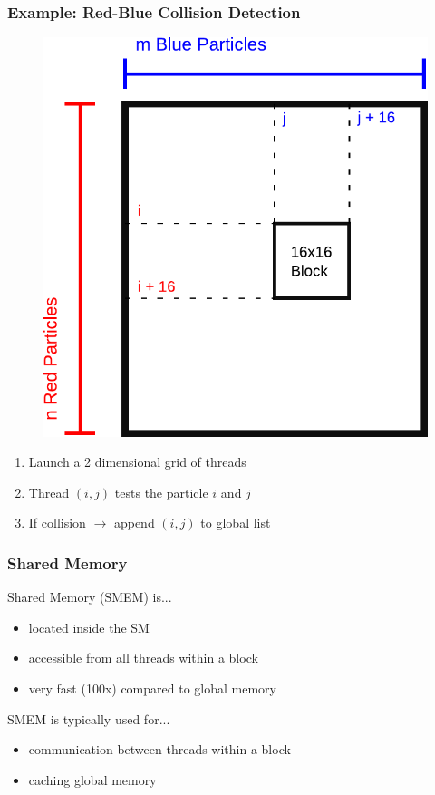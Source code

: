 \documentclass[aspectratio=169,handout]{beamer}
\begin{document}
\begin{frame}[fragile]
\frametitle{Example: Red-Blue Collision Detection}
\begin{minipage}{0.4\linewidth}
	\vspace{0.3cm}
		\begin{figure}
	\includegraphics[height=0.7\textheight]{red_blue_particles2}
\end{figure}
\end{minipage}
\begin{minipage}{0.57\linewidth}
\begin{enumerate}
	\item Launch a 2 dimensional grid of threads
	\item Thread $(i,j)$ tests the particle $i$ and $j$
	\item If collision $\rightarrow$ append $(i,j)$ to global list
\end{enumerate}
\end{minipage}
\end{frame}


\begin{frame}[fragile]
\frametitle{Shared Memory}

Shared Memory (SMEM) is...
\begin{itemize}
	\item located inside the SM
	\item accessible from all threads within a block
	\item very fast (100x) compared to global memory
\end{itemize}
SMEM is typically used for...
\begin{itemize}
	\item communication between threads within a block
	\item caching global memory
\end{itemize}
\end{frame}
\end{document}
